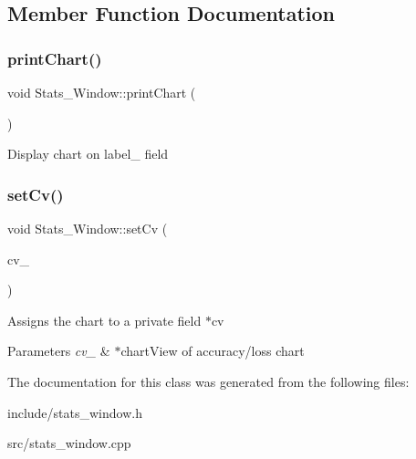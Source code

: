 \subsection{Member Function Documentation}
\mbox{\label{classStats__Window_a1bdd2d19e64d9c316754e3f667ebbecb}} 
\subsubsection{\texorpdfstring{print\+Chart()}{printChart()}}
{\footnotesize\ttfamily void Stats\+\_\+\+Window\+::print\+Chart (\begin{DoxyParamCaption}{ }\end{DoxyParamCaption})}

Display chart on label\+\_ field \mbox{\label{classStats__Window_aa08614ebaf747b305a39bb790d2a96bd}} 
\subsubsection{\texorpdfstring{set\+Cv()}{setCv()}}
{\footnotesize\ttfamily void Stats\+\_\+\+Window\+::set\+Cv (\begin{DoxyParamCaption}\item[{Q\+Chart\+View $\ast$}]{cv\+\_\+ }\end{DoxyParamCaption})}

Assigns the chart to a private field $\ast$cv 
\begin{DoxyParams}{Parameters}
{\em cv\+\_\+} & $\ast$chart\+View of accuracy/loss chart \\
\hline
\end{DoxyParams}


The documentation for this class was generated from the following files\+:\begin{DoxyCompactItemize}
\item 
include/stats\+\_\+window.\+h\item 
src/stats\+\_\+window.\+cpp\end{DoxyCompactItemize}
